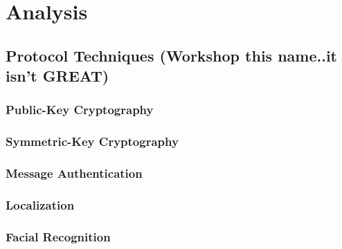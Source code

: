 \documentclass[12pt]{report}
\begin{document}

\section{Analysis}


\subsection{Protocol Techniques (Workshop this name..it isn't GREAT)}

\subsubsection{Public-Key Cryptography}

\subsubsection{Symmetric-Key Cryptography}

\subsubsection{Message Authentication}

\subsubsection{Localization}

\subsubsection{Facial Recognition}
\end{document}
